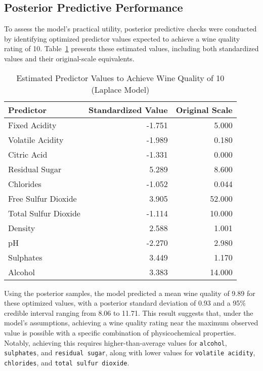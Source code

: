 \documentclass[12pt]{article}
\begin{document}
    \subsection{Posterior Predictive Performance}
    
    To assess the model's practical utility, posterior predictive checks were conducted by identifying optimized predictor values expected to achieve a wine quality rating of 10. Table~\ref{tab:estimated_predictors_laplace} presents these estimated values, including both standardized values and their original-scale equivalents. 
    
\begin{table}[h!]
    \centering
    \caption{Estimated Predictor Values to Achieve Wine Quality of 10 (Laplace Model)}
    \begin{tabular}{lrr}
    \hline
    \textbf{Predictor} & \textbf{Standardized Value} & \textbf{Original Scale} \\
    \hline
    Fixed Acidity        & -1.751 & 5.000 \\
    Volatile Acidity     & -1.989 & 0.180 \\
    Citric Acid          & -1.331 & 0.000 \\
    Residual Sugar       & 5.289  & 8.600 \\
    Chlorides            & -1.052 & 0.044 \\
    Free Sulfur Dioxide  & 3.905  & 52.000 \\
    Total Sulfur Dioxide & -1.114 & 10.000 \\
    Density              & 2.588  & 1.001 \\
    pH                   & -2.270 & 2.980 \\
    Sulphates            & 3.449  & 1.170 \\
    Alcohol              & 3.383  & 14.000 \\
    \hline
    \end{tabular}
    \label{tab:estimated_predictors_laplace}
\end{table}

    
    
    Using the posterior samples, the model predicted a mean wine quality of 9.89 for these optimized values, with a posterior standard deviation of 0.93 and a 95\% credible interval ranging from 8.06 to 11.71. This result suggests that, under the model’s assumptions, achieving a wine quality rating near the maximum observed value is possible with a specific combination of physicochemical properties. Notably, achieving this requires higher-than-average values for \texttt{alcohol}, \texttt{sulphates}, and \texttt{residual sugar}, along with lower values for \texttt{volatile acidity}, \texttt{chlorides}, and \texttt{total sulfur dioxide}.
    
\end{document}
